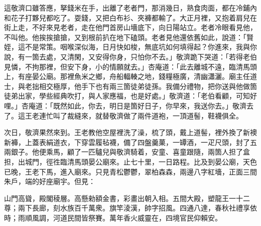 這敬濟口雖答應，拏錢米在手，出離了老者門，那消幾日，熟食肉面，都在冷鋪內和花子打夥兒都吃了。耍錢，又把白布衫、夾褲都輸了。大正月裡，又抱着肩兒在街上走，不好來見老者，走在他門首房山墻底下，向日陽站立。老者冷眼看見他，不叫他。他挨挨搶搶，又到根前扒在地下磕頭。{}老者見他還依舊如此，說道：「賢姪，這不是常策。咽喉深似海，日月快如梭，無底坑如何填得起？你進來，我與你說，有一箇去處，又清閑，又安得你身，只怕你不去。」敬濟跪下哭道：「若得老伯見憐，不拘那裡，但安下身，小的情願就去。」杏庵道：「此去離城不遠，臨清馬頭上，有座晏公廟。那裡魚米之鄉，舟船輻輳之地，錢糧極廣，清幽瀟灑。廟主任道士，與老拙相交極厚，他手下也有兩三箇徒弟徒孫。我備分禮物，把你送與他做箇徒弟出家，學些經典吹打，與人家應福，也是好處。」敬濟道：「老伯看顧，可知好哩。」杏庵道：「既然如此，你去，明日是箇好日子，你早來，我送你去。」敬濟去了。這王老連忙叫了裁縫來，就替敬濟做了兩件道袍，一頂道髻，鞋襪俱全。

次日，敬濟果然來到。王老教他空屋裡洗了澡，梳了頭，戴上道髻，裡外換了新襖新褲，上蓋表絹道衣，下穿雲履毡襪，備了四盤羹菓，一罈酒，一疋尺頭，封了五兩銀子。他便乘馬，顧了一匹驢兒與敬濟騎着，安童、喜童跟隨，兩箇人担了盒担，出城門，徑徃臨清馬頭晏公廟來。止七十里，一日路程。比及到晏公廟，天色已晚，王老下馬，進入廟來。只見青松鬱鬱，翠柏森森，兩邊八字紅墻，正面三間朱戶，端的好座廟宇。但見：

\begin{myquote}
山門高聳，殿閣稜層。高懸勑額金書，彩畫出朝入相。{}五間大殿，塑龍王一十二尊；兩下長廊，刻水族百千萬衆。旗竿淩漢，帥字招風。四通八達，春秋社禮享依時；雨順風調，河道民間皆祭賽。萬年香火威靈在，四境官民仰賴安。
\end{myquote}

